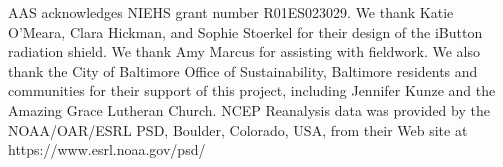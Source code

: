 \documentclass[draft,linenumbers]{agujournal}
\begin{document}
%
%

%

%




%
%
%
%
%
%
%


\acknowledgments
AAS acknowledges NIEHS grant number R01ES023029. We thank Katie O'Meara, Clara Hickman, and Sophie Stoerkel for their design of the iButton radiation shield. We thank Amy Marcus for assisting with fieldwork.  We also thank the City of Baltimore Office of Sustainability, Baltimore residents and communities for their support of this project, including Jennifer Kunze and the Amazing Grace Lutheran Church. 
NCEP Reanalysis data was provided by the NOAA/OAR/ESRL PSD, Boulder, Colorado, USA, from their Web site at https://www.esrl.noaa.gov/psd/
\end{document}
